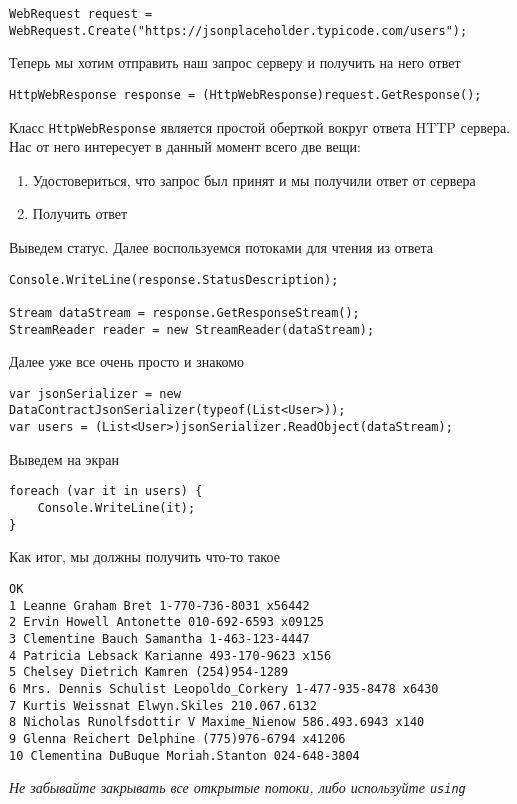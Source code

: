 \begin{verbatim}
WebRequest request = WebRequest.Create("https://jsonplaceholder.typicode.com/users");
\end{verbatim}

Теперь мы хотим отправить наш запрос серверу и получить на него ответ

\begin{verbatim}
HttpWebResponse response = (HttpWebResponse)request.GetResponse();
\end{verbatim}

Класс \texttt{HttpWebResponse} является простой оберткой вокруг ответа HTTP сервера. Нас от него интересует в данный момент всего две вещи: 

\begin{enumerate}
    \item Удостовериться, что запрос был принят и мы получили ответ от сервера
    \item Получить ответ
\end{enumerate}

Выведем статус. Далее воспользуемся потоками для чтения из ответа

\begin{verbatim}
Console.WriteLine(response.StatusDescription);

Stream dataStream = response.GetResponseStream();
StreamReader reader = new StreamReader(dataStream);
\end{verbatim}

Далее уже все очень просто и знакомо

\begin{verbatim}
var jsonSerializer = new DataContractJsonSerializer(typeof(List<User>));
var users = (List<User>)jsonSerializer.ReadObject(dataStream);
\end{verbatim}

Выведем на экран

\begin{verbatim}
foreach (var it in users) {
    Console.WriteLine(it);
}
\end{verbatim}

Как итог, мы должны получить что-то такое

\begin{verbatim}
OK
1 Leanne Graham Bret 1-770-736-8031 x56442
2 Ervin Howell Antonette 010-692-6593 x09125
3 Clementine Bauch Samantha 1-463-123-4447
4 Patricia Lebsack Karianne 493-170-9623 x156
5 Chelsey Dietrich Kamren (254)954-1289
6 Mrs. Dennis Schulist Leopoldo_Corkery 1-477-935-8478 x6430
7 Kurtis Weissnat Elwyn.Skiles 210.067.6132
8 Nicholas Runolfsdottir V Maxime_Nienow 586.493.6943 x140
9 Glenna Reichert Delphine (775)976-6794 x41206
10 Clementina DuBuque Moriah.Stanton 024-648-3804
\end{verbatim}

\textit{Не забывайте закрывать все открытые потоки, либо используйте \texttt{using}}

